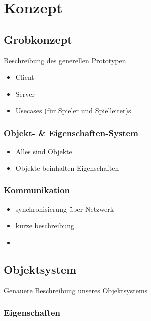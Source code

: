 \chapter{Konzept}
\label{concept}


\section{Grobkonzept}
\label{sec:Grobkonzept}
Beschreibung des generellen Prototypen

\begin{itemize}
	\item Client
	\item Server
	\item Usecases (für Spieler und Spielleiter)s
\end{itemize}



\subsection{Objekt- \& Eigenschaften-System}
\label{sec:ObjektEigenschaftenSystem}

\begin{itemize}
	\item Alles sind Objekte
	\item Objekte beinhalten Eigenschaften
\end{itemize}


\subsection{Kommunikation}
\label{sec:Kommunikation}


\begin{itemize}
	\item synchronisierung über Netzwerk
	\item kurze beschreibung 
	\item {}
\end{itemize}


\section{Objektsystem}
\label{sec:Objektsystem}
Genauere Beschreibung unseres Objektsystems\newline


\subsection{Eigenschaften}
\label{sec:Eigenschaften}

